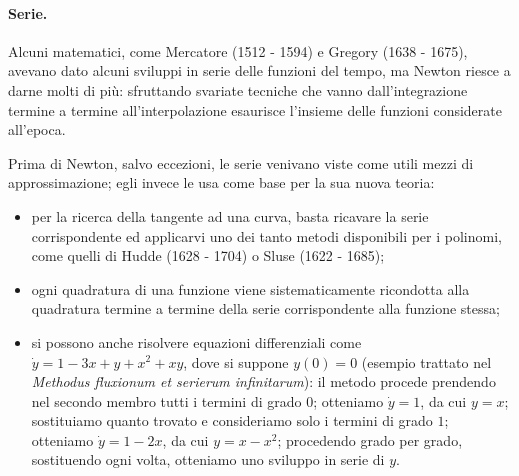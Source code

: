 \paragraph{Serie.} Alcuni matematici, come Mercatore (1512 - 1594) e Gregory (1638 - 1675), avevano dato alcuni sviluppi in serie delle funzioni del tempo, ma Newton riesce a darne molti di pi\`u: sfruttando svariate tecniche che vanno dall'integrazione termine a termine all'interpolazione esaurisce l'insieme delle funzioni considerate all'epoca.
\par Prima di Newton, salvo eccezioni, le serie venivano viste come utili mezzi di approssimazione; egli invece le usa come base per la sua nuova teoria:
\begin{itemize}
	\item per la ricerca della tangente ad una curva, basta ricavare la serie corrispondente ed applicarvi uno dei tanto metodi disponibili per i polinomi, come quelli di Hudde (1628 - 1704) o Sluse (1622 - 1685);
	\item ogni quadratura di una funzione viene sistematicamente ricondotta alla quadratura termine a termine della serie corrispondente alla funzione stessa;
	\item si possono anche risolvere equazioni differenziali come $\dot{y} = 1 - 3x + y + x^2 + xy$, dove si suppone $y(0) = 0$ (esempio trattato nel \textit{Methodus fluxionum et serierum infinitarum}): il metodo procede prendendo nel secondo membro tutti i termini di grado $0$; otteniamo $\dot{y} = 1$, da cui $y = x$; sostituiamo quanto trovato e consideriamo solo i termini di grado $1$; otteniamo $\dot{y} = 1 - 2x$, da cui $y = x - x^2$; procedendo grado per grado, sostituendo ogni volta, otteniamo uno sviluppo in serie di $y$.
\end{itemize}
